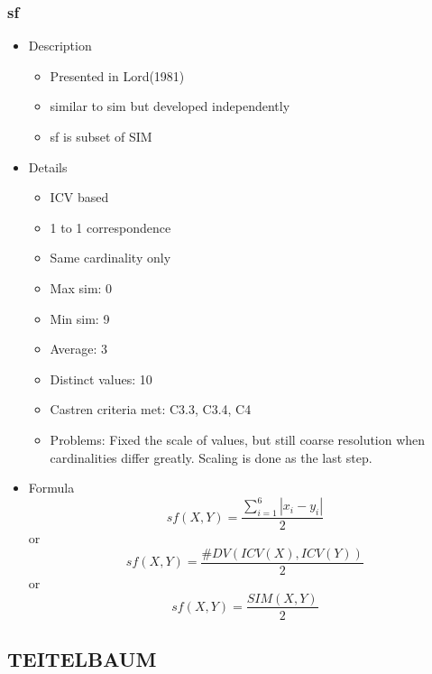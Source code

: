\documentclass{article}
\begin{document}
\subsubsection{sf}
\label{sec-6-2-1}
\begin{itemize}

\item Description
\label{sec-6-2-1-1}%
\begin{itemize}
\item Presented in Lord(1981)
\item similar to sim but developed independently
\item sf is subset of SIM
\end{itemize}

\item Details
\label{sec-6-2-1-2}%
\begin{itemize}
\item ICV based
\item 1 to 1 correspondence
\item Same cardinality only
\item Max sim: 0
\item Min sim: 9
\item Average: 3
\item Distinct values: 10
\item Castren criteria met: C3.3, C3.4, C4
\item Problems: Fixed the scale of values, but still coarse resolution
  when cardinalities differ greatly. Scaling is done as the last step.
\end{itemize}

\item Formula\\
\label{sec-6-2-1-3}%
$$ sf\left(X,Y\right)=\frac{\sum_{i=1}^{6}\left|x_{i}-y_{i}\right|}{2} $$
or 
$$ sf\left(X,Y\right)=\frac{\#DV\left(ICV\left(X\right),ICV\left(Y\right)\right)}{2} $$
or
$$ sf(X,Y)=\frac{SIM(X,Y)}{2} $$
\end{itemize} %
\subsection{TEITELBAUM}
\label{sec-6-3}
\end{document}
